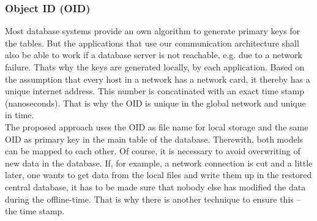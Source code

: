 %
%
%
%
%
%
%

\subsubsection{Object ID (OID)}
\label{object_id_heading}

Most database systems provide an own algorithm to generate primary keys for the
tables. But the applications that use our communication architecture shall also
be able to work if a database server is not reachable, e.g. due to a network
failure. Thats why the keys are generated locally, by each application.
Based on the assumption that every host in a network has a network card, it thereby
has a unique internet address. This number is concatinated with an exact time stamp
(nanoseconds). That is why the OID is unique in the global network and unique in
time.\\
The proposed approach uses the OID as file name for local storage and the same
OID as primary key in the main table of the database. Therewith, both models can
be mapped to each other. Of course, it is necessary to avoid overwriting of new
data in the database. If, for example, a network connection is cut and a little
later, one wants to get data from the local files and write them up in the restored
central database, it has to be made sure that nobody else has modified the data
during the offline-time. That is why there is another technique to ensure this
-- the time stamp.

